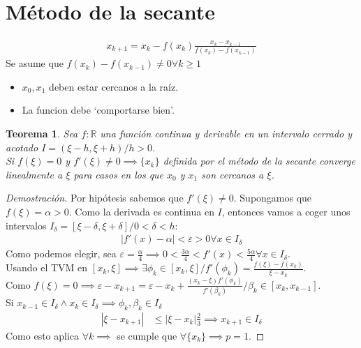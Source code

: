 \documentclass{article}
\newtheorem{theo}{Teorema}
\begin{document}
\section{Método de la secante}
\begin{equation}
    \begin{split}
        \boxed{
            x_{k+1} = x_{k} - f(x_{k}) \frac{x_{k}-x_{k-1}}{f(x_{k})-f(x_{k-1})}
        }
    \end{split}
\end{equation}
Se asume que $f(x_{k})-f(x_{k-1}) \neq 0 \forall k \geq 1$
\begin{itemize}
    \item $x_{0},x_{1}$ deben estar cercanos a la raíz.
    \item La funcion debe `comportarse bien'.
\end{itemize}
\begin{theo}
    Sea $f:\mathbb{R}$ una función continua y derivable en un intervalo cerrado y acotado
    $I=(\xi -h,\xi +h) / h>0$.\\
    Si $f(\xi )=0$ y $f'(\xi ) \neq 0 \implies \{ x_{k} \}$ definida por el método de la
    secante converge linealmente a $\xi $ para casos en los que $x_{0}$ y $x_{1}$ son cercanos
    a $\xi $.
\end{theo}
\begin{proof}[Demostración]
    Por hipótesis sabemos que $f'(\xi ) \neq 0$. Supongamos que $f(\xi )= \alpha >0$.
    Como la derivada es continua en $I$, entonces vamos a coger unos intervalos
    $I_{\delta } = [\xi -\delta , \xi +\delta ] / 0 < \delta < h$:
    \begin{equation}
        \begin{split}
            |f'(x)-\alpha | <\varepsilon > 0 \forall x \in I_{\delta }
        \end{split}
    \end{equation}
    Como podemos elegir, sea $\varepsilon  = \frac{\alpha }{4} \implies 0 < \frac{3\alpha }{4}
    < f'(x) < \frac{5\alpha }{4} \forall x \in I_{\delta }$.\\
    Usando el TVM en $[x_{k}, \xi ] \implies \exists \phi _{k} \in [x_{k}, \xi ] / 
    f'(\phi _{k}) = \frac{f(\xi )-f(x_{k})}{\xi -x_{k}}$.\\
    Como $f(\xi )=0 \implies \varepsilon -x_{k+1} = \varepsilon -x_{k} + 
    \frac{(x_{k}-\xi )f'(\phi _{k})}{f'(\beta _{k})} / \beta _{k} \in [x_{k}, x_{k-1}]$.\\
    Si $x_{k-1} \in I_{\delta } \wedge x_{k} \in I_{\delta } \implies \phi _{k},\beta _{k} \in I_{\delta }$
    \begin{equation}
        \begin{split}
            |\xi -x_{k+1}| &\leq |\xi -x_{k}|\frac{2}{3} \implies x_{k+1} \in I_{\delta }
        \end{split}
    \end{equation}
    Como esto aplica $\forall k \implies $ se cumple que $\forall \{ x_{k} \} \implies p=1$.
\end{proof}
\end{document}
